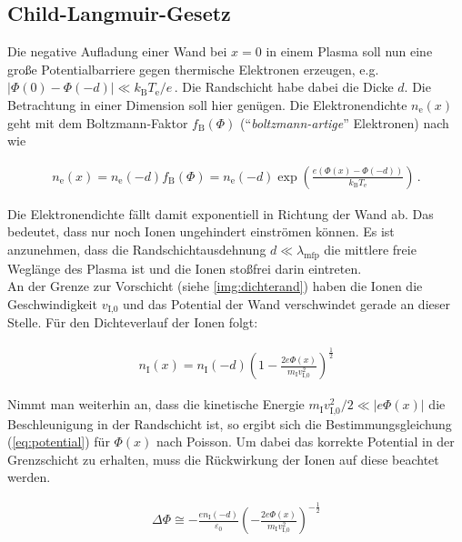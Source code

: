 \documentclass[numbers=noenddot,a4paper,notitlepage,twoside,BCOR15mm]{scrbook}
\newcommand{\ix}[1]{_\text{#1}}
\newcommand{\tilt}[1]{\textit{#1}}
\begin{document}
		\subsection{Child-Langmuir-Gesetz} \label{subsub:childlang}

		Die negative Aufladung einer Wand bei $x=0$ in einem Plasma soll nun eine große Potentialbarriere gegen thermische Elektronen erzeugen, e.g. $|\Phi\left(0\right)-\Phi\left(-d\right)|\ll k\ix{B}T\ix{e}/e\,$. Die Randschicht habe dabei die Dicke $d$. Die Betrachtung in einer Dimension soll hier genügen. Die Elektronendichte $n\ix{e}\left(x\right)$ geht mit dem Boltzmann-Faktor $f\ix{B}\left(\Phi\right)$ ("`\tilt{boltzmann-artige}"' Elektronen) nach \cite{Piel10} wie

			\begin{align}
				n\ix{e}\left(x\right)=n\ix{e}\left(-d\right)f\ix{B}\left(\Phi\right)=n\ix{e}\left(-d\right)\exp\left(\frac{e\left(\Phi\left(x\right)-\Phi\left(-d\right)\right)}{k\ix{B}T\ix{e}}\right) \, . \label{eq:randschichtdichte}
			\end{align}

		Die Elektronendichte fällt damit exponentiell in Richtung der Wand ab. Das bedeutet, dass nur noch Ionen ungehindert einströmen können. Es ist anzunehmen, dass die Randschichtausdehnung $d\ll\lambda\ix{mfp}$ die mittlere freie Weglänge des Plasma ist und die Ionen stoßfrei darin eintreten.\\
		An der Grenze zur Vorschicht (siehe \ref{img:dichterand}) haben die Ionen die Geschwindigkeit $v\ix{I,0}$ und das Potential der Wand verschwindet gerade an dieser Stelle. Für den Dichteverlauf der Ionen folgt:

			\begin{align}
				n\ix{I}\left(x\right)=n\ix{I}\left(-d\right)\left(1-\frac{2e\Phi\left(x\right)}{m\ix{I}v\ix{I,0}^2}\right)^{\frac{1}{2}}
			\end{align}

		Nimmt man weiterhin an, dass die kinetische Energie $m\ix{I}v\ix{I,0}^2/2\ll |e\Phi\left(x\right)|$ die Beschleunigung in der Randschicht ist,  so ergibt sich die Bestimmungsgleichung (\ref{eq:potential}) für $\Phi\left(x\right)$ nach Poisson. Um dabei das korrekte Potential in der Grenzschicht zu erhalten, muss die Rückwirkung der Ionen auf diese beachtet werden.

			\begin{align}
				\Delta\Phi\cong-\frac{en\ix{I}\left(-d\right)}{\varepsilon\ix{0}}\left(-\frac{2e\Phi\left(x\right)}{m\ix{I}v\ix{I,0}^2}\right)^{-\frac{1}{2}} \label{eq:potential}
			\end{align}
\end{document}
